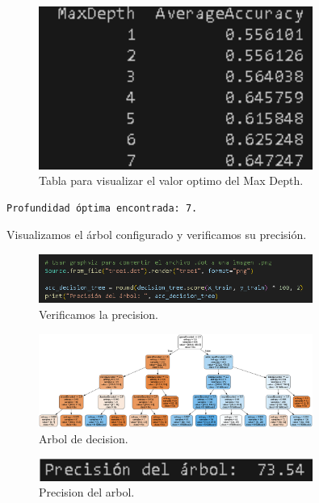 \documentclass[a4paper,12pt]{article}
\begin{document}
\begin{figure}[H]
    \centering
    \includegraphics[width=0.8\textwidth]{28.png}
    \caption{Tabla para visualizar el valor optimo del Max Depth.}
\end{figure}

\begin{verbatim}
Profundidad óptima encontrada: 7.
\end{verbatim}

Visualizamos el árbol configurado y verificamos su precisión.

\begin{figure}[H]
    \centering
    \includegraphics[width=0.8\textwidth]{29.png}
    \caption{Verificamos la precision.}
\end{figure}

\begin{figure}[H]
    \centering
    \includegraphics[width=0.8\textwidth]{../tree1.png}
    \caption{Arbol de decision.}
\end{figure}

\begin{figure}[H]
    \centering
    \includegraphics[width=0.8\textwidth]{30.png}
    \caption{Precision del arbol.}
\end{figure}
\end{document}
